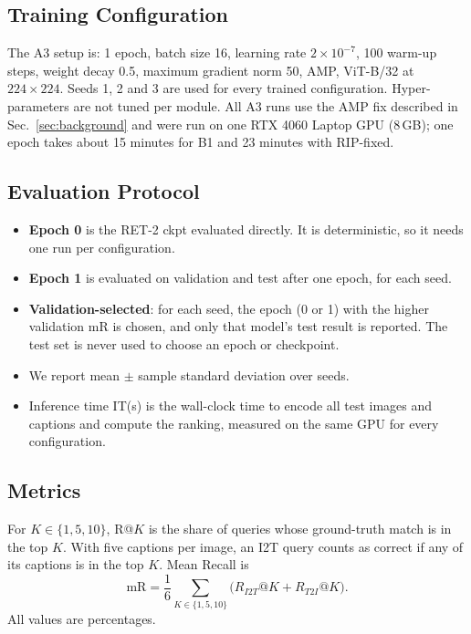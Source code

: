 \documentclass[conference]{IEEEtran}
\begin{document}
\subsection{Training Configuration}
The A3 setup is: 1 epoch, batch size 16, learning rate $2\times10^{-7}$, 100 warm-up steps, weight decay 0.5, maximum gradient norm 50, AMP, ViT-B/32 at $224\times224$. Seeds 1, 2 and 3 are used for every trained configuration. Hyper-parameters are not tuned per module. All A3 runs use the AMP fix described in Sec.~\ref{sec:background} and were run on one RTX 4060 Laptop GPU (8\,GB); one epoch takes about 15 minutes for B1 and 23 minutes with RIP-fixed.

\subsection{Evaluation Protocol}
\begin{itemize}
\item \textbf{Epoch 0} is the RET-2 ckpt evaluated directly. It is deterministic, so it needs one run per configuration.
\item \textbf{Epoch 1} is evaluated on validation and test after one epoch, for each seed.
\item \textbf{Validation-selected}: for each seed, the epoch (0 or 1) with the higher validation mR is chosen, and only that model's test result is reported. The test set is never used to choose an epoch or checkpoint.
\item We report mean $\pm$ sample standard deviation over seeds.
\item Inference time IT(s) is the wall-clock time to encode all test images and captions and compute the ranking, measured on the same GPU for every configuration.
\end{itemize}

\subsection{Metrics}
For $K\in\{1,5,10\}$, R@$K$ is the share of queries whose ground-truth match is in the top $K$. With five captions per image, an I2T query counts as correct if any of its captions is in the top $K$. Mean Recall is
\begin{equation}
\mathrm{mR} = \frac{1}{6}\sum_{K\in\{1,5,10\}}\big(R_{I2T}@K + R_{T2I}@K\big).
\end{equation}
All values are percentages.
\end{document}
